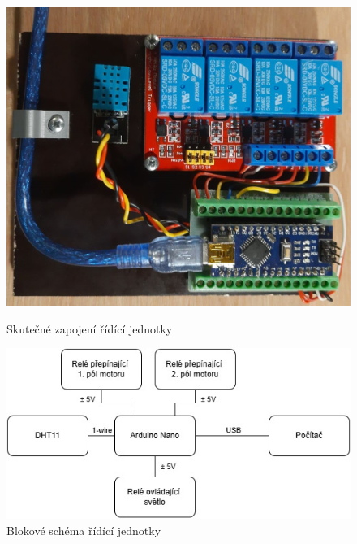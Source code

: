 \begin{figure}[htbp]
    \centering
    \begin{minipage}[b]{0.45\textwidth}
        \centering
        \includegraphics[width=\textwidth]{img/ridici_jednotka}
        \caption{Skutečné zapojení řídící jednotky}
        \label{fig:ridici_jednotka}
    \end{minipage}
    \hfill
    \begin{minipage}[b]{0.45\textwidth}
        \centering
        \includegraphics[width=\textwidth]{img/schema_ridici_jednotky}
        \caption{Blokové schéma řídící jednotky}
        \label{fig:schema_ridici_jednotky}
    \end{minipage}
\end{figure}


